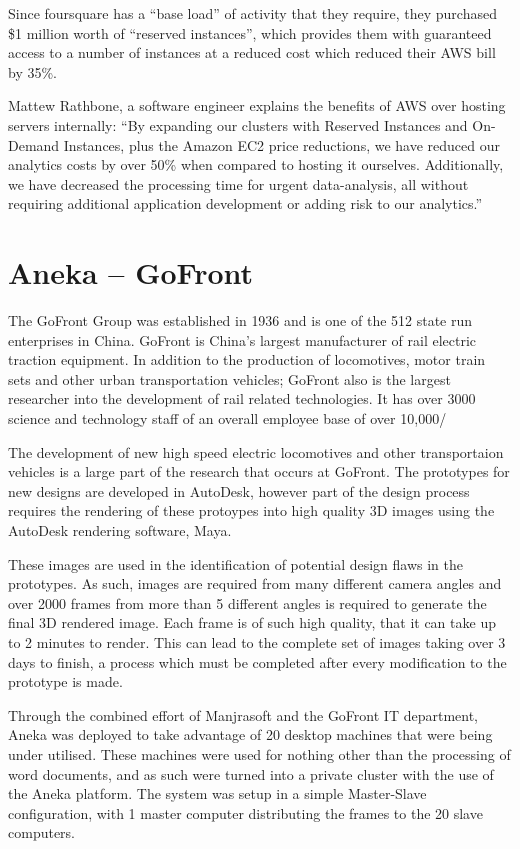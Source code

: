 Since foursquare has a ``base load'' of activity that they require, they purchased \$1 million worth of ``reserved instances'', which provides them with guaranteed access to a number of instances at a reduced cost which reduced their AWS bill by 35\%. 

Mattew Rathbone, a software engineer explains the benefits of AWS over hosting servers internally: ``By expanding our clusters with Reserved Instances and On-Demand Instances, plus the Amazon EC2 price reductions, we have reduced our analytics costs by over 50\% when compared to hosting it ourselves. Additionally, we have decreased the processing time for urgent data-analysis, all without requiring additional application development or adding risk to our analytics.''\ftSAmTwo
\ftSAmTwoText

\section{Aneka -- GoFront}

The GoFront Group was established in 1936 and is one of the 512 state run enterprises in China. 
GoFront is China's largest manufacturer of rail electric traction equipment. In addition to the production of locomotives, motor train sets and other urban transportation vehicles; GoFront also is the largest researcher into the development of rail related technologies. It has over 3000 science and technology staff of an overall employee base of over 10,000\ftSAnOne{}\ftSAnTwo{}\cite{Aneka}/
\ftSAnOneText\ftSAnTwoText 

The development of new high speed electric locomotives and other transportaion vehicles is a large part of the research that occurs at GoFront. The prototypes for new designs are developed in AutoDesk, however part of the design process requires the rendering of these protoypes into high quality 3D images using the AutoDesk rendering software, Maya. 

These images are used in the identification of potential design flaws in the prototypes. As such, images are required from many different camera angles and over 2000 frames from more than 5 different angles is required to generate the final 3D rendered image. Each frame is of such high quality, that it can take up to 2 minutes to render. This can lead to the complete set of images taking over 3 days to finish, a process which must be completed after every modification to the prototype is made. 

Through the combined effort of Manjrasoft and the GoFront IT department, Aneka was deployed to take advantage of 20 desktop machines that were being under utilised. These machines were used for nothing other than the processing of word documents, and as such were turned into a private cluster with the use of the Aneka platform. The system was setup in a simple Master-Slave configuration, with 1 master computer distributing the frames to the 20 slave computers.

